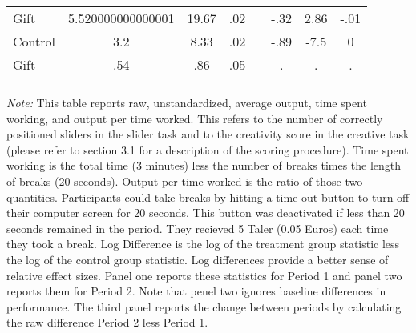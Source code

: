 \begin{landscape}
\begin{table}[h]
\begin{center}
{\begin{tabular}{lccccccc}
\hline
Gift & 5.520000000000001 & 19.67 & .02 && -.32 & 2.86 & -.01 \\
Control & 3.2 & 8.33 & .02 && -.89 & -7.5 & 0 \\
Gift & .54 & .86 & .05 && . & . & . \\
\hline\hline\noalign{\medskip}
\end{tabular}}
\begin{minipage}{1.2\textwidth}
\footnotesize {\it Note:} This table reports raw, unstandardized, average output, time spent working, and output per time worked. 
This refers to the number of correctly positioned sliders in the slider task and to the creativity score in the creative task (please refer to section 3.1 for a description of the scoring procedure). 
Time spent working is the total time (3 minutes) less the number of breaks times the length of breaks (20 seconds). 
Output per time worked is the ratio of those two quantities. 
Participants could take breaks by hitting a time-out button to turn off their computer screen for 20 seconds. This button was deactivated if less than 20 seconds remained in the period. They recieved 5 Taler (0.05 Euros) each time they took a break. 
Log Difference is the log of the treatment group statistic less the log of the control group statistic. Log differences provide a better sense of relative effect sizes. 
Panel one reports these statistics for Period 1 and panel two reports them for Period 2. Note that penel two ignores baseline differences in performance. 
The third panel reports the change between periods by calculating the raw difference Period 2 less Period 1. 
 
 
\end{minipage}
\end{center}
\end{table}
\end{landscape}
